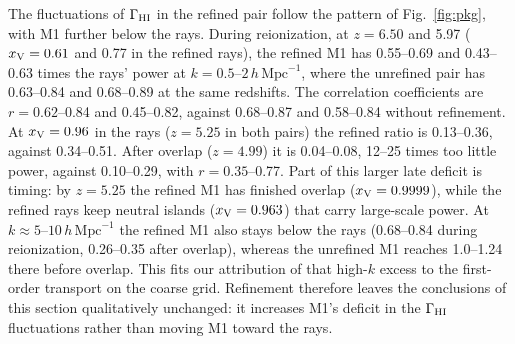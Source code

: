 \documentclass[iop]{openjournal}
\newcommand{\hmpc}{\,h\,\mathrm{Mpc}^{-1}}
\newcommand{\xv}{x_{\rm V}}
\begin{document}
The fluctuations of $\Gamma_{\rm HI}$ in the refined pair follow the pattern of Fig.~\ref{fig:pkg}, with M1 further below the rays. During reionization, at $z=6.50$ and 5.97 ($\xv=0.61$ and 0.77 in the refined rays), the refined M1 has 0.55--0.69 and 0.43--0.63 times the rays' power at $k=0.5$--$2\hmpc$, where the unrefined pair has 0.63--0.84 and 0.68--0.89 at the same redshifts. The correlation coefficients are $r=0.62$--0.84 and 0.45--0.82, against 0.68--0.87 and 0.58--0.84 without refinement. At $\xv=0.96$ in the rays ($z=5.25$ in both pairs) the refined ratio is 0.13--0.36, against 0.34--0.51. After overlap ($z=4.99$) it is 0.04--0.08, 12--25 times too little power, against 0.10--0.29, with $r=0.35$--0.77. Part of this larger late deficit is timing: by $z=5.25$ the refined M1 has finished overlap ($\xv=0.9999$), while the refined rays keep neutral islands ($\xv=0.963$) that carry large-scale power. At $k\approx5$--$10\hmpc$ the refined M1 also stays below the rays (0.68--0.84 during reionization, 0.26--0.35 after overlap), whereas the unrefined M1 reaches 1.0--1.24 there before overlap. This fits our attribution of that high-$k$ excess to the first-order transport on the coarse grid. Refinement therefore leaves the conclusions of this section qualitatively unchanged: it increases M1's deficit in the $\Gamma_{\rm HI}$ fluctuations rather than moving M1 toward the rays.
\end{document}
